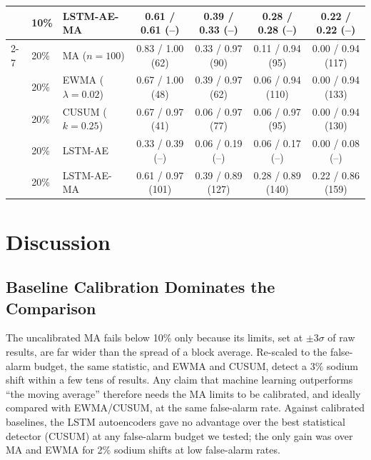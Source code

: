 \documentclass[conference]{IEEEtran}
\begin{document}
\begin{table}[!t]
\begin{tabular}{lll cccc}
 & 10\% & LSTM-AE-MA & 0.61 / 0.61 (--) & 0.39 / 0.33 (--) & 0.28 / 0.28 (--) & 0.22 / 0.22 (--) \\
\cmidrule(lr){2-7}
 & 20\% & MA ($n{=}100$) & 0.83 / 1.00 (62) & 0.33 / 0.97 (90) & 0.11 / 0.94 (95) & 0.00 / 0.94 (117) \\
 & 20\% & EWMA ($\lambda{=}0.02$) & 0.67 / 1.00 (48) & 0.39 / 0.97 (62) & 0.06 / 0.94 (110) & 0.00 / 0.94 (133) \\
 & 20\% & CUSUM ($k{=}0.25$) & 0.67 / 0.97 (41) & 0.06 / 0.97 (77) & 0.06 / 0.97 (95) & 0.00 / 0.94 (130) \\
 & 20\% & LSTM-AE & 0.33 / 0.39 (--) & 0.06 / 0.19 (--) & 0.06 / 0.17 (--) & 0.00 / 0.08 (--) \\
 & 20\% & LSTM-AE-MA & 0.61 / 0.97 (101) & 0.39 / 0.89 (127) & 0.28 / 0.89 (140) & 0.22 / 0.86 (159) \\
\bottomrule
\end{tabular}
\end{table}

\section{Discussion}
\label{sec:discussion}

\subsection{Baseline Calibration Dominates the Comparison}
The uncalibrated MA fails below 10\% only because its limits, set at $\pm3\sigma$ of raw results, are far wider than the spread of a block average. Re-scaled to the false-alarm budget, the same statistic, and EWMA and CUSUM, detect a 3\% sodium shift within a few tens of results. Any claim that machine learning outperforms ``the moving average'' therefore needs the MA limits to be calibrated, and ideally compared with EWMA/CUSUM, at the same false-alarm rate. Against calibrated baselines, the LSTM autoencoders gave no advantage over the best statistical detector (CUSUM) at any false-alarm budget we tested; the only gain was over MA and EWMA for 2\% sodium shifts at low false-alarm rates.
\end{document}
